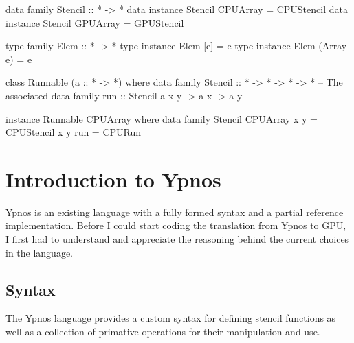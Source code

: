 \documentclass[12pt,a4paper,oneside]{scrbook}
\begin{document}
\begin{hflisting}[label=lst:datafam, caption=The data family declares two
  different constructors for a stencil depending on the type of array the
  stencil is run on.]

data family Stencil :: * -> *
data instance Stencil CPUArray = CPUStencil
data instance Stencil GPUArray = GPUStencil

\end{hflisting}

\begin{hflisting}[label=lst:typesynfam, caption=The type synonym family is used
  as a type function. It is used to work out the element type of a collection.]

type family Elem :: * -> *
type instance Elem [e] = e
type instance Elem (Array e) = e

\end{hflisting}

\begin{hflisting}[label=lst:assoctypefam, caption={The data family from
  listing~\ref{lst:datafam} has now been associated with the class
  \texttt{Runnable} for certain types of array.}]

class Runnable (a :: * -> *) where
  data family Stencil :: * -> * -> * -> * -- The associated data family
  run :: Stencil a x y -> a x -> a y

instance Runnable CPUArray where
  data family Stencil CPUArray x y = CPUStencil x y
  run = CPURun

\end{hflisting}

\section{Introduction to Ypnos}

Ypnos is an existing language with a fully formed syntax and a partial reference
implementation. Before I could start coding the translation from Ypnos to GPU, I
first had to understand and appreciate the reasoning behind the current choices
in the language.

\subsection{Syntax}

The Ypnos language provides a custom syntax for defining stencil functions as
well as a collection of primative operations for their manipulation and use.
\end{document}
